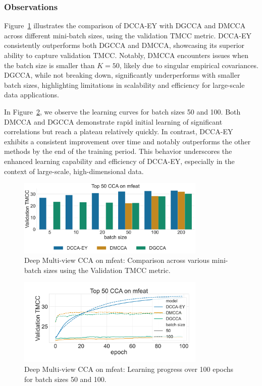 \subsubsection{Observations}
Figure~\ref{fig:dmcca_corr} illustrates the comparison of DCCA-EY with DGCCA and DMCCA across different mini-batch sizes, using the validation TMCC metric.
DCCA-EY consistently outperforms both DGCCA and DMCCA, showcasing its superior ability to capture validation TMCC. Notably, DMCCA encounters issues when the batch size is smaller than $K=50$, likely due to singular empirical covariances.
DGCCA, while not breaking down, significantly underperforms with smaller batch sizes, highlighting limitations in scalability and efficiency for large-scale data applications.

In Figure~\ref{fig:dmcca_lr}, we observe the learning curves for batch sizes 50 and 100. Both DMCCA and DGCCA demonstrate rapid initial learning of significant correlations but reach a plateau relatively quickly. In contrast, DCCA-EY exhibits a consistent improvement over time and notably outperforms the other methods by the end of the training period. This behavior underscores the enhanced learning capability and efficiency of DCCA-EY, especially in the context of large-scale, high-dimensional data.

\begin{figure}
    \centering
    \includegraphics[width=0.8\textwidth]{figures/DMCCA/mfeat_models_different_batch_sizes}
    \caption{Deep Multi-view CCA on mfeat: Comparison across various mini-batch sizes using the Validation TMCC metric.}\label{fig:dmcca_corr}
\end{figure}

\begin{figure}
    \centering
    \includegraphics[width=0.8\textwidth]{figures/DMCCA/mfeat_allbatchsizes_pcc}
    \caption{Deep Multi-view CCA on mfeat: Learning progress over 100 epochs for batch sizes 50 and 100.}\label{fig:dmcca_lr}
\end{figure}


